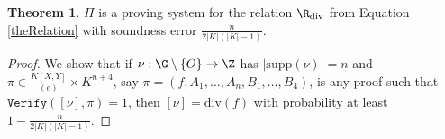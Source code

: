 \documentclass[11pt,letterpaper]{article}
\theoremstyle{definition}
\newtheorem{theorem}{Theorem}[subsection]
\newcommand{\6}{\mathbf}
\newcommand{\7}{\mathcal}
\begin{document}
\begin{theorem}\label{thm:DivisorSoundness}
$\Pi$ is a proving system for the relation $\R_{\text{div}}$ from Equation \ref{theRelation} with 
soundness error $\frac{n}{2\left|K\right|\left(\left|K\right|-1\right)}$.
\end{theorem}
\begin{proof}
We show that if $\nu: \G\setminus\left\{O\right\} \to \Z$ has $\left|\text{supp}(\nu)\right| = n$ and $\pi \in \frac{K[X,Y]}{(e)} \times K^{n+4}$, say $\pi=(f, A_1, \ldots, A_n, B_1, \ldots, B_4)$, is any proof such that $\texttt{Verify}([\nu], \pi) = 1$, then $[\nu] = \text{div}(f)$ with probability at least $1 - \frac{n}{2\left|K\right|(\left|K\right|-1)}$.


\end{proof}
\end{document}
